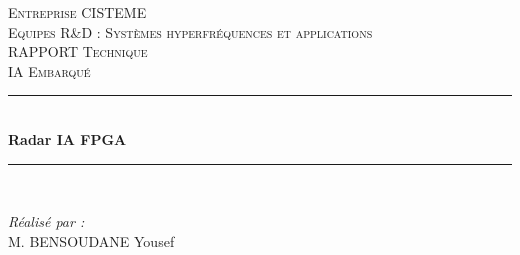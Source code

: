 \begin{titlepage}
	\newcommand{\HRule}{\rule{\linewidth}{0.5mm}} 
%		
%		
	\begin{center}
		
		\textsc{\LARGE{}Entreprise CISTEME} \\[1.5cm]
		\textsc{\Large{}Equipes R\&D : Systèmes hyperfréquences et applications} \\[1.5cm]
		
		
		\textsc{\large{}RAPPORT Technique} \\[0.5cm]
		\textsc{\large{}IA Embarqué}\\[0.5cm]
		
		
		
		\HRule \\[0.6cm]
		{\huge\bfseries{}Radar IA FPGA} \\[0.25cm]
		\HRule \\[1.5cm]
		
		\begin{minipage}[t]{0.5\linewidth}
			\begin{flushleft}
				\Large\textit{Réalisé par :} \\
				
				M. \textsc{BENSOUDANE} Yousef \\%


\end{flushleft}
\end{minipage}
\end{center}
\end{titlepage}
